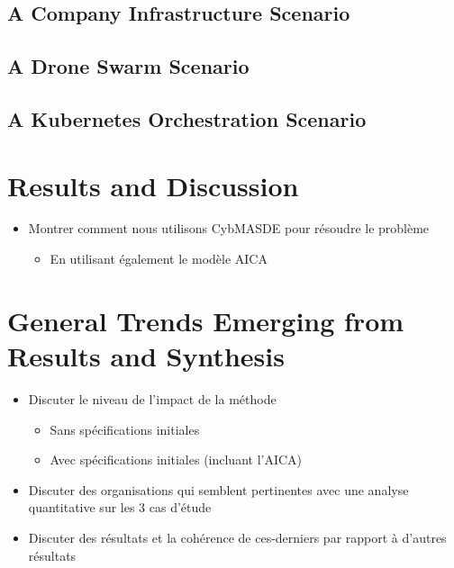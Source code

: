 \subsection{A Company Infrastructure Scenario}
\subsection{A Drone Swarm Scenario}
\subsection{A Kubernetes Orchestration Scenario}


\section{Results and Discussion}
\begin{itemize}

    \item Montrer comment nous utilisons CybMASDE pour résoudre le problème
          \begin{itemize}
              \item En utilisant également le modèle AICA
          \end{itemize}
\end{itemize}

\section{General Trends Emerging from Results and Synthesis}
\begin{itemize}
    \item Discuter le niveau de l'impact de la méthode
          \begin{itemize}
              \item Sans spécifications initiales
              \item Avec spécifications initiales (incluant l'AICA)
          \end{itemize}
    \item Discuter des organisations qui semblent pertinentes avec une analyse quantitative sur les 3 cas d'étude
    \item Discuter des résultats et la cohérence de ces-derniers par rapport à d'autres résultats
\end{itemize}
